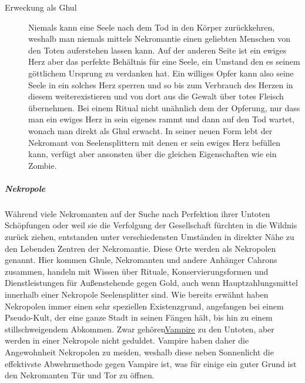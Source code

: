 \documentclass[a4paper,12pt,oneside]{book}
\begin{document}
\begin{description}
\item[Erweckung als Ghul] Niemals kann eine Seele nach dem Tod in den Körper zurückkehren, weshalb man niemals mittels Nekromantie einen geliebten Menschen von den Toten auferstehen lassen kann. Auf der anderen Seite ist ein ewiges Herz aber das perfekte Behältnis für eine Seele, ein Umstand den es seinem göttlichem Ursprung zu verdanken hat. Ein williges Opfer kann also seine Seele in ein solches Herz sperren und so bis zum Verbrauch des Herzen in diesem weiterexistieren und von dort aus die Gewalt über totes Fleisch übernehmen. Bei einem Ritual nicht unähnlich dem der Opferung, nur dass man ein ewiges Herz in sein eigenes rammt und dann auf den Tod wartet, wonach man direkt als Ghul erwacht. In seiner neuen Form lebt der Nekromant von Seelensplittern mit denen er sein ewiges Herz befüllen kann, verfügt aber ansonsten über die gleichen Eigenschaften wie ein Zombie.
\end{description}
\subparagraph{Nekropole}\label{Nekropole}
Während viele Nekromanten auf der Suche nach Perfektion ihrer Untoten Schöpfungen oder weil sie die Verfolgung der Gesellschaft fürchten in die Wildnis zurück ziehen, entstanden unter verschiedensten Umständen in direkter Nähe zu den Lebenden Zentren der Nekromantie. Diese Orte werden als Nekropolen genannt. Hier kommen Ghule, Nekromanten und andere Anhänger Cahrons zusammen, handeln mit Wissen über Rituale, Konservierungsformen und Dienstleistungen für Außenstehende gegen Gold, auch wenn Hauptzahlungsmittel innerhalb einer Nekropole Seelensplitter sind. Wie bereits erwähnt haben Nekropolen immer einen sehr speziellen Existenzgrund, angefangen bei einem Pseudo-Kult, der eine ganze Stadt in seinen Fängen hält, bis hin zu einem stillschweigendem Abkommen. Zwar gehören\uline{\hyperref[Vampir]{Vampire}} zu den Untoten, aber werden in einer Nekropole nicht geduldet. Vampire haben daher die Angewohnheit Nekropolen zu meiden, weshalb diese neben Sonnenlicht die effektivste Abwehrmethode gegen Vampire ist, was für einige ein guter Grund ist den Nekromanten Tür und Tor zu öffnen.
\end{document}
